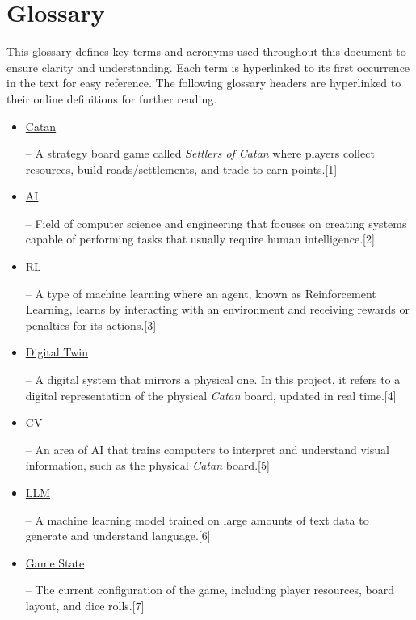 \documentclass{article}
\newcommand{\CatanExt}{\href{https://en.wikipedia.org/wiki/Catan}{Catan}}
\newcommand{\AIExt}{\href{https://en.wikipedia.org/wiki/Artificial_intelligence}{AI}}
\newcommand{\RLExt}{\href{https://www.ibm.com/think/topics/reinforcement-learning}{RL}}
\newcommand{\DigitalTwinExt}{\href{https://en.wikipedia.org/wiki/Digital_twin}{Digital Twin}}
\newcommand{\CVExt}{\href{https://www.ibm.com/think/topics/computer-vision}{CV}}
\newcommand{\LLMExt}{\href{https://www.cloudflare.com/learning/ai/what-is-large-language-model/}{LLM}}
\newcommand{\GameStateExt}{\href{https://milvus.io/ai-quick-reference/what-is-a-state-in-rl}{Game State}}
\begin{document}
\newcommand{\Catan}{\hyperlink{glossary-catan}{Catan}}
\newcommand{\AI}{\hyperlink{glossary-ai}{AI}}
\newcommand{\RL}{\hyperlink{glossary-rl}{RL}}
\newcommand{\DigitalTwin}{\hyperlink{glossary-dt}{Digital Twin}}
\newcommand{\CV}{\hyperlink{glossary-cv}{CV}}
\newcommand{\LLM}{\hyperlink{glossary-llm}{LLM}}
\newcommand{\GameState}{\hyperlink{glossary-gamestate}{Game State}}

\section*{Glossary}
\raggedright This glossary defines key terms and acronyms used throughout this document to ensure clarity and understanding. Each term is hyperlinked to its first occurrence in the text for easy reference.
The following glossary headers are hyperlinked to their online definitions for further reading.
\begin{itemize}
    \item \hypertarget{glossary-catan}{\CatanExt{}} – A strategy board game called \textit{Settlers of Catan} where players collect resources, build roads/settlements, and trade to earn points.[1]
    \item \hypertarget{glossary-ai}{\AIExt{}} – Field of computer science and engineering that focuses on creating systems capable of performing tasks that usually require human intelligence.[2]
    \item \hypertarget{glossary-rl}{\RLExt{}} – A type of machine learning where an agent, known as Reinforcement Learning, learns by interacting with an environment and receiving rewards or penalties for its actions.[3]
    \item \hypertarget{glossary-dt}{\DigitalTwinExt{}} – A digital system that mirrors a physical one. In this project, it refers to a digital representation of the physical \emph{Catan} board, updated in real time.[4]
    \item \hypertarget{glossary-cv}{\CVExt{}} – An area of AI that trains computers to interpret and understand visual information, such as the physical \emph{Catan} board.[5]
    \item \hypertarget{glossary-llm}{\LLMExt{}} – A machine learning model trained on large amounts of text data to generate and understand language.[6]
    \item \hypertarget{glossary-gamestate}{\GameStateExt{}} – The current configuration of the game, including player resources, board layout, and dice rolls.[7]
\end{itemize}
\end{document}
